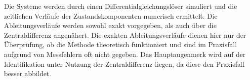 Die Systeme werden durch einen Differentialgleichungslöser simuliert und die zeitlichen Verläufe der Zustandskomponenten numerisch ermittelt. Die Ableitungsverläufe werden sowohl exakt vorgegeben, als auch über die Zentraldifferenz angenähert. Die exakten Ableitungsverläufe dienen hier nur der Überprüfung, ob die Methode theoretisch funktioniert und sind im Praxisfall aufgrund von Messfehlern oft nicht gegeben. Das Hauptaugenmerk wird auf der Identifikation unter Nutzung der Zentraldifferenz liegen, da diese den Praxisfall besser abbildet.







